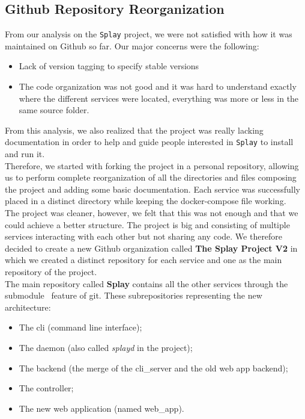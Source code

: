\documentclass{eplmastersthesis}
\begin{document}
      \subsection{Github Repository Reorganization}

        From our analysis on the \texttt{Splay} project, we were not satisfied with how
        it was maintained on Github so far. Our major concerns were the
        following:

        \begin{itemize}
          \item Lack of version tagging to specify stable versions
          \item The code organization was not good and it was hard to
          understand exactly where the different services were located,
          everything was more or less in the same source folder.
        \end{itemize}

        From this analysis, we also realized that the project was really
        lacking documentation in order to help and guide people interested
        in \texttt{Splay} to install and run it.\\

        Therefore, we started with forking the project in a personal repository,
        allowing us to perform complete reorganization of all the directories
        and files composing the project and adding some basic documentation.
        Each service was successfully placed in a distinct directory while
        keeping the docker-compose file working.\\
        The project was cleaner, however, we felt that this was not enough
        and that we could achieve a better structure. The project is big and
        consisting of multiple services interacting with each other but
        not sharing any code. We therefore decided to create a new Github
        organization called \textbf{The Splay Project V2} in which we created
        a distinct repository for each service and one as the main repository
        of the project.\\

        The main repository called \textbf{Splay} contains all the other services
        through the submodule~\cite{GitSubmodules} feature of git. These
        subrepositories representing the new architecture:

        \begin{itemize}
          \item The cli (command line interface);
          \item The daemon (also called \textit{splayd} in the project);
          \item The backend (the merge of the cli\_server and the old web app backend);
          \item The controller;
          \item The new web application (named web\_app).
        \end{itemize}
\end{document}
